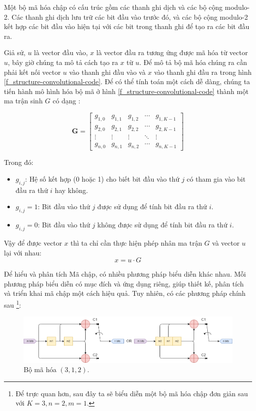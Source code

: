 Một bộ mã hóa chập có cấu trúc gồm các thanh ghi dịch và các bộ cộng modulo-2. Các thanh ghi dịch lưu trữ các bit đầu vào trước đó, và các bộ cộng modulo-2 kết hợp các bit đầu vào hiện tại với các bit trong thanh ghi để tạo ra các bit đầu ra. 

Giả sử, $u$ là vector đầu vào, $x$ là vector đầu ra tương ứng được mã hóa từ vector $u$, bây giờ chúng ta mô tả cách tạo ra $x$ từ $u$. Để mô tả bộ mã hóa chúng ra cần phải kết nối vector $u$ vào thanh ghi đầu vào và $x$ vào thanh ghi đầu ra trong hình \ref{f_structure-convolutional-code}. Để có thể tính toán một cách dễ dàng, chúng ta tiến hành mô hình hóa bộ mã ở hình \ref{f_structure-convolutional-code} thành một ma trận sinh $G$ có dạng :

\[
\mathbf{G} = 
\begin{bmatrix}
	g_{1,0} & g_{1,1} & g_{1,2} & \cdots & g_{1,K-1} \\
	g_{2,0} & g_{2,1} & g_{2,2} & \cdots & g_{2,K-1} \\
	\vdots & \vdots & \vdots & \ddots & \vdots \\
	g_{n,0} & g_{n,1} & g_{n,2} & \cdots & g_{n,K-1}
\end{bmatrix}
\]

Trong đó:
\begin{itemize}[label = -]
	\item \( g_{i,j} \): Hệ số kết hợp (0 hoặc 1) cho biết bit đầu vào thứ \( j \) có tham gia vào bit đầu ra thứ \( i \) hay không.
	\item \( g_{i,j} = 1 \): Bit đầu vào thứ \( j \) được sử dụng để tính bit đầu ra thứ \( i \).
	\item \( g_{i,j} = 0 \): Bit đầu vào thứ \( j \) không được sử dụng để tính bit đầu ra thứ \( i \).
\end{itemize}

Vậy để được vector $x$ thì ta chỉ cần thực hiện phép nhân ma trận $G$ và vector $u$ lại với nhau: 
\[ x = u \cdot G \]

Để hiểu và phân tích Mã chập, có nhiều phương pháp biểu diễn khác nhau. Mỗi phương pháp biểu diễn có mục đích và ứng dụng riêng, giúp thiết kế, phân tích và triển khai mã chập một cách hiệu quả. Tuy nhiên, có các phương pháp chính sau \footnote{Để trực quan hơn, sau đây ta sẽ biểu diễn một bộ mã hóa chập đơn giản sau với $K = 3, n = 2, m = 1$.}:

\begin{figure}[H]
	\centering
	\includegraphics[width=\linewidth]{sections/pic/cosolythuyet/block_convolutional_encoder.png}
	\caption{Bộ mã hóa $(3, 1, 2)$.}
	\label{f_ex_block_conv_encoder}
\end{figure}

